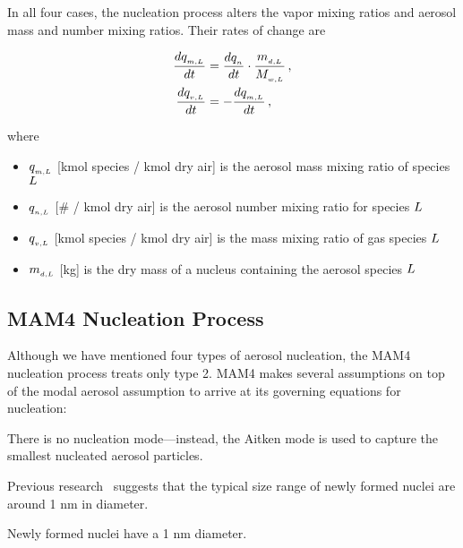In all four cases, the nucleation process alters the vapor mixing ratios and
aerosol mass and number mixing ratios. Their rates of change are

\begin{align}
\frac{d q\dsub{m,\specidx}}{dt} &= \frac{d q\dsub{n}}{dt} \cdot \frac{m\dsub{d,\specidx}}{\mw{\specidx}} \,, \labeleq{nuc:aer}\\
\frac{d\vmass{\specidx}}{dt} &= -\frac{d q\dsub{m,\specidx}}{dt} \,, \labeleq{nuc:gas}
\end{align}

where
\begin{itemize}
  \item $q_{_{m,L}}$ [kmol species / kmol dry air] is the aerosol mass
        mixing ratio of species $L$
  \item $q_{_{n,L}}$ [\# / kmol dry air] is the aerosol number mixing
        ratio for species $L$
  \item $q_{_{v,L}}$ [kmol species / kmol dry air] is the mass mixing
        ratio of gas species $L$
  \item $m_{_{d,L}}$ [kg] is the dry mass of a nucleus containing the
        aerosol species $L$
\end{itemize}

\subsection{MAM4 Nucleation Process}

Although we have mentioned four types of aerosol nucleation, the MAM4 nucleation
process treats only type 2. MAM4 makes several assumptions on top of the modal
aerosol assumption to arrive at its governing equations for nucleation:

\begin{assume}
  There is no nucleation mode---instead, the Aitken mode is used to capture the
  smallest nucleated aerosol particles.
\end{assume}

Previous research~\cite{kerminen-2002-jas} suggests that the typical size
range of newly formed nuclei are around 1 nm in diameter.

\begin{assume}
  Newly formed nuclei have a 1 nm diameter.
\end{assume}

